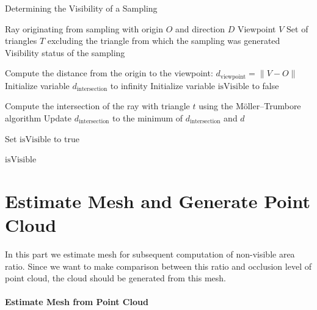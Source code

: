 \documentclass[11pt, a4paper,oneside,chapterprefix=false]{scrbook}
\begin{document}
\begin{algorithm}[H]
\caption{Determining the Visibility of a Sampling}\label{alg:visibility_sampling}
\begin{algorithmic}
\Require Ray originating from sampling with origin \( O \) and direction \( D \)
\Require Viewpoint \( V \)
\Require Set of triangles \( T \) excluding the triangle from which the sampling was generated
\Ensure Visibility status of the sampling

\State Compute the distance from the origin to the viewpoint: \( d_{\text{viewpoint}} = \| V - O \| \)
\State Initialize variable \( d_{\text{intersection}} \) to infinity
\State Initialize variable \( \text{isVisible} \) to false

    \State Compute the intersection of the ray with triangle \( t \) using the Möller–Trumbore algorithm
        \State Update \( d_{\text{intersection}} \) to the minimum of \( d_{\text{intersection}} \) and \( d \)
    \EndIf
\EndFor

    \State Set \( \text{isVisible} \) to true  
\EndIf

\State \Return \( \text{isVisible} \)
\end{algorithmic}
\end{algorithm}
 
\section{Estimate Mesh and Generate Point Cloud} \label{sec:estimate mesh and generate point cloud}

In this part we estimate mesh for subsequent computation of non-visible area ratio. Since we want to make comparison between this ratio and occlusion level of point cloud, the cloud should be generated from this mesh. 

\paragraph{Estimate Mesh from Point Cloud} \label{par:estimate mesh from point cloud}
\end{document}
